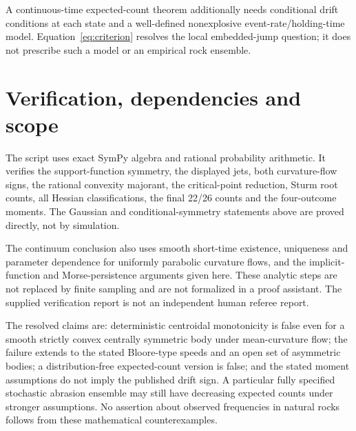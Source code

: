 \documentclass[11pt,a4paper]{article}
\theoremstyle{remark}\newtheorem{remark}[theorem]{Remark}
\begin{document}
A continuous-time expected-count theorem additionally needs conditional drift conditions at each state and a well-defined nonexplosive event-rate/holding-time model. Equation~\eqref{eq:criterion} resolves the local embedded-jump question; it does not prescribe such a model or an empirical rock ensemble.

\section{Verification, dependencies and scope}
The script  uses exact SymPy algebra and rational probability arithmetic. It verifies the support-function symmetry, the displayed jets, both curvature-flow signs, the rational convexity majorant, the critical-point reduction, Sturm root counts, all Hessian classifications, the final 22/26 counts and the four-outcome moments. The Gaussian and conditional-symmetry statements above are proved directly, not by simulation.

The continuum conclusion also uses smooth short-time existence, uniqueness and parameter dependence for uniformly parabolic curvature flows, and the implicit-function and Morse-persistence arguments given here. These analytic steps are not replaced by finite sampling and are not formalized in a proof assistant. The supplied verification report is not an independent human referee report.

The resolved claims are: deterministic centroidal monotonicity is false even for a smooth strictly convex centrally symmetric body under mean-curvature flow; the failure extends to the stated Bloore-type speeds and an open set of asymmetric bodies; a distribution-free expected-count version is false; and the stated moment assumptions do not imply the published drift sign. A particular fully specified stochastic abrasion ensemble may still have decreasing expected counts under stronger assumptions. No assertion about observed frequencies in natural rocks follows from these mathematical counterexamples.
\end{document}
